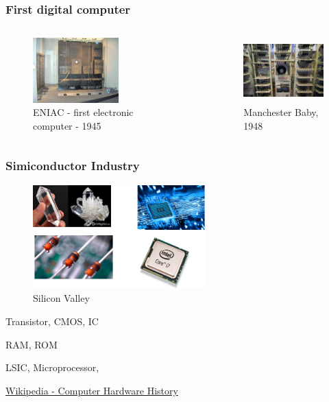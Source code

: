 \documentclass[xcolor={table, dvipsnames}]{beamer}
\begin{document}
\begin{frame}
\frametitle{First digital computer}

\begin{columns}
\begin{figure}[h!]
  \includegraphics[height=2.5cm]{img/ENIAC.jpg}
    \caption{ENIAC - first electronic computer - 1945}
\end{figure}
\begin{figure}[h!]
  \includegraphics[height=2.5cm]{img/manchester_baby.jpg}
    \caption{Manchester Baby, 1948}
\end{figure}
\end{columns}

\end{frame}

\begin{frame}
\frametitle{Simiconductor Industry}

\begin{figure}[h!]
  \includegraphics[height=4cm]{img/computer_architecture-simiconductor.png}
    \caption{Silicon Valley}
\end{figure}

Transistor, CMOS, IC

 RAM, ROM

LSIC, Microprocessor,

\href{https://en.wikipedia.org/wiki/History_of_computing_hardware_(1960s\%E2\%80\%93present)}{Wikipedia - Computer Hardware History}
 
\end{frame}
\end{document}
